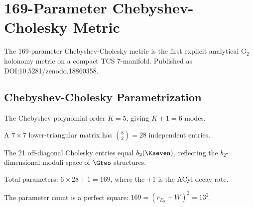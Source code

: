 \chapter{169-Parameter Chebyshev-Cholesky Metric}\label{chap:chebyshev_metric}

The 169-parameter Chebyshev-Cholesky metric is the first explicit analytical G$_2$
holonomy metric on a compact TCS 7-manifold. Published as DOI:10.5281/zenodo.18860358.

\section{Chebyshev-Cholesky Parametrization}

\begin{definition}\label{def:chebyshev_K}
    \leanok
    The Chebyshev polynomial order $K = 5$, giving $K + 1 = 6$ modes.
\end{definition}

\begin{definition}\label{def:cholesky_entries}
    \leanok
    A $7 \times 7$ lower-triangular matrix has $\binom{8}{2} = 28$ independent entries.
\end{definition}

\begin{theorem}[Off-diagonal = $b_2$]\label{thm:cholesky_offdiag_b2}
    \leanok
    The 21 off-diagonal Cholesky entries equal $b_2(\Kseven)$, reflecting
    the $b_2$-dimensional moduli space of $\Gtwo$ structures.
\end{theorem}

\begin{theorem}\label{thm:169_params}
    \leanok
    Total parameters: $6 \times 28 + 1 = 169$, where the $+1$ is the ACyl decay rate.
\end{theorem}

\begin{theorem}[$169 = 13^2 = \alpha_{\mathrm{sum}}^2$]\label{thm:169_square}
    \leanok
    The parameter count is a perfect square: $169 = (r_{E_8} + W)^2 = 13^2$.
\end{theorem}

